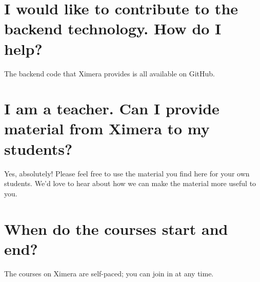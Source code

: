 \documentclass{ximera}
\begin{document}
\section{I would like to contribute to the backend technology.  How do I help?}

The backend code that Ximera provides is all available on
GitHub.

\section{I am a teacher.  Can I provide material from Ximera to my students?}

Yes, absolutely!  Please feel free to use the material you find here
for your own students.  We'd love to hear about how we can make the
material more useful to you.

\section{When do the courses start and end?}

The courses on Ximera are self-paced; you can join in at any time.
\end{document}
